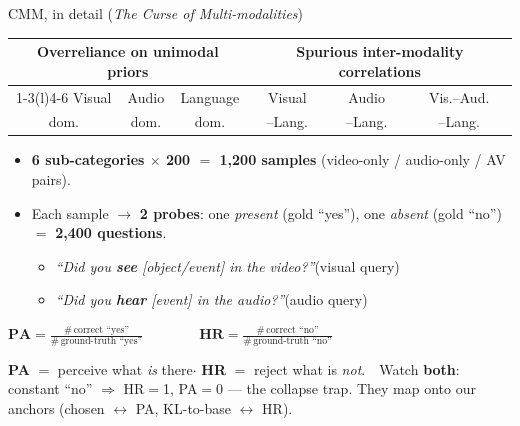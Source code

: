\documentclass[aspectratio=169,11pt]{beamer}
\begin{document}
\begin{frame}{CMM, in detail (\emph{The Curse of Multi-modalities})}
\centering\footnotesize
\setlength{\tabcolsep}{5pt}
\begin{tabular}{@{}ccc|ccc@{}}
\multicolumn{3}{c}{\textbf{Overreliance on unimodal priors}} &
\multicolumn{3}{c}{\textbf{Spurious inter-modality correlations}} \\
\cmidrule(r){1-3}\cmidrule(l){4-6}
Visual & Audio & Language & Visual & Audio & Vis.--Aud. \\
dom. & dom. & dom. & --Lang. & --Lang. & --Lang. \\
\bottomrule
\end{tabular}
\par\vspace{0.5em}
\raggedright
\begin{itemize}\scriptsize
\item \textbf{6 sub-categories $\times$ 200 $=$ 1,200 samples} (video-only / audio-only / AV pairs).
\item Each sample $\to$ \textbf{2 probes}: one \emph{present} (gold ``yes''), one \emph{absent} (gold ``no'') $=$ \textbf{2,400 questions}.
  \begin{itemize}\scriptsize
  \item[] \emph{``Did you \textbf{see} [object/event] in the video?''}\quad(visual query)
  \item[] \emph{``Did you \textbf{hear} [event] in the audio?''}\quad(audio query)
  \end{itemize}
\end{itemize}
\vspace{0.2em}
\centering
$\displaystyle \mathbf{PA}=\frac{\#\,\text{correct ``yes''}}{\#\,\text{ground-truth ``yes''}}
\qquad\qquad
\mathbf{HR}=\frac{\#\,\text{correct ``no''}}{\#\,\text{ground-truth ``no''}}$
\par\vspace{0.4em}
{\scriptsize \textbf{PA} $=$ perceive what \emph{is} there\quad$\cdot$\quad
\textbf{HR} $=$ reject what is \emph{not}.\ \ Watch \textbf{both}: constant ``no'' $\Rightarrow$ HR$=$1, PA$=$0
--- the collapse trap. They map onto our anchors (chosen $\leftrightarrow$ PA, KL-to-base $\leftrightarrow$ HR).}
\end{frame}
\end{document}
